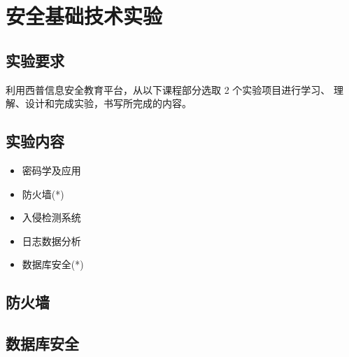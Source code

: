 \documentclass[../main.tex]{subfiles}
\begin{document}
\chapter{安全基础技术实验}
\section{实验要求}
利用西普信息安全教育平台，从以下课程部分选取 2 个实验项目进行学习、
理解、设计和完成实验，书写所完成的内容。
%
\section{实验内容}
\begin{itemize}
  \item 密码学及应用
  \item 防火墙(*)
  \item 入侵检测系统
  \item 日志数据分析
  \item 数据库安全(*)
\end{itemize}
%
\section{防火墙}









%
\section{数据库安全}





\end{document}
